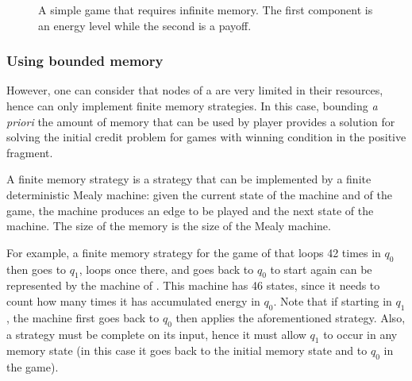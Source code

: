 \begin{figure}
\centering
{}
\caption{A simple game that requires infinite memory. The first component is an energy level while the second is a payoff.}
\label{tj:fig:infmemoryneeded}
\end{figure}

\subsubsection{Using bounded memory}

However, one can consider that nodes of a \wsn are very limited in their resources, hence can only implement finite memory strategies.
In this case, bounding \emph{a priori} the amount of memory that can be used by player provides a solution for solving the initial credit problem for games with winning condition in the positive fragment.

A finite memory strategy is a strategy that can be implemented by a finite deterministic Mealy machine: given the current state of the machine and of the game, the machine produces an edge to be played and the next state of the machine.
The size of the memory is the size of the Mealy machine.

For example, a finite memory strategy for the game of  that loops 42 times in $q_0$ then goes to $q_1$, loops once there, and goes back to $q_0$ to start again can be represented by the machine of .
This machine has 46 states, since it needs to count how many times it has accumulated energy in $q_0$.
Note that if starting in $q_1$, the machine first goes back to $q_0$ then applies the aforementioned strategy.
Also, a strategy must be complete on its input, hence it must allow $q_1$ to occur in any memory state (in this case it goes back to the initial memory state and to $q_0$ in the game).

